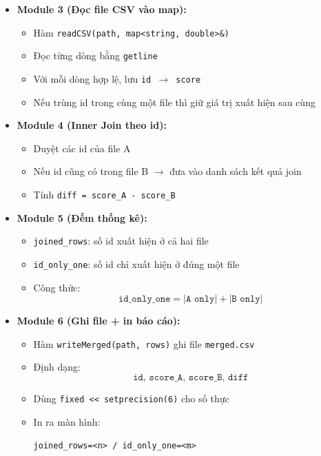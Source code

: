 \begin{itemize}
\begin{itemize}
        \item \textbf{Module 3 (Đọc file CSV vào map):}
        \begin{itemize}
            \item Hàm \texttt{readCSV(path, map<string, double>\&)}
            \item Đọc từng dòng bằng \texttt{getline}
            \item Với mỗi dòng hợp lệ, lưu \texttt{id $\rightarrow$ score}
            \item Nếu trùng id trong cùng một file thì giữ giá trị xuất hiện sau cùng
        \end{itemize}

        \item \textbf{Module 4 (Inner Join theo id):}
        \begin{itemize}
            \item Duyệt các id của file A
            \item Nếu id cũng có trong file B $\rightarrow$ đưa vào danh sách kết quả join
            \item Tính \texttt{diff = score\_A - score\_B}
        \end{itemize}

        \item \textbf{Module 5 (Đếm thống kê):}
        \begin{itemize}
            \item \texttt{joined\_rows}: số id xuất hiện ở cả hai file
            \item \texttt{id\_only\_one}: số id chỉ xuất hiện ở đúng một file
            \item Công thức:
            \[
                \texttt{id\_only\_one}
                =
                |\texttt{A only}| + |\texttt{B only}|
            \]
        \end{itemize}

        \item \textbf{Module 6 (Ghi file + in báo cáo):}
        \begin{itemize}
            \item Hàm \texttt{writeMerged(path, rows)} ghi file \texttt{merged.csv}
            \item Định dạng:
            \[
                \texttt{id, score\_A, score\_B, diff}
            \]
            \item Dùng \texttt{fixed << setprecision(6)} cho số thực
            \item In ra màn hình:
            \begin{center}
                \texttt{joined\_rows=<n> / id\_only\_one=<m>}
            \end{center}
        \end{itemize}
    \end{itemize}


\end{itemize}
